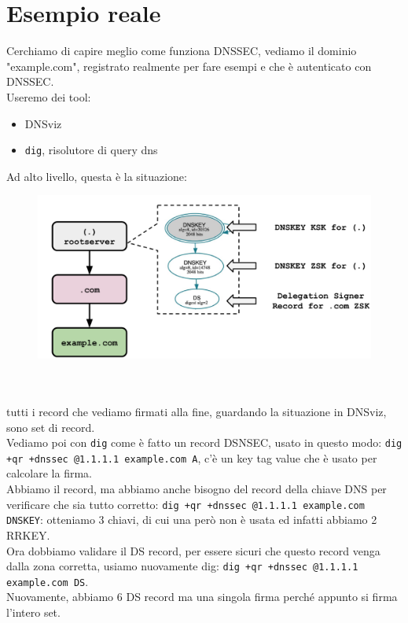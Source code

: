 \documentclass[12pt, oneside]{extbook} %
\begin{document}
\section{Esempio reale}
Cerchiamo di capire meglio come funziona DNSSEC, vediamo il dominio "example.com", registrato realmente per fare esempi e che è autenticato con DNSSEC.
\\Useremo dei tool:
\begin{itemize}
	\item DNSviz
	\item \texttt{dig}, risolutore di query dns
\end{itemize}
Ad alto livello, questa è la situazione:\\
\begin{figure}[h!]
    \centering
    \includegraphics[scale=0.5]{../../immagini/dns_ex_1}
\end{figure}\\\\
tutti i record che vediamo firmati alla fine, guardando la situazione in DNSviz, sono set di record.
\\Vediamo poi con \texttt{dig} come è fatto un record DSNSEC, usato in questo modo: \texttt{dig +qr +dnssec @1.1.1.1 example.com A}, c'è un key tag value che è usato per calcolare la firma.
\\Abbiamo il record, ma abbiamo anche bisogno del record della chiave DNS per verificare che sia tutto corretto: \texttt{dig +qr +dnssec @1.1.1.1 example.com DNSKEY}: otteniamo 3 chiavi, di cui una però non è usata ed infatti abbiamo 2 RRKEY.
\\Ora dobbiamo validare il DS record, per essere sicuri che questo record venga dalla zona corretta, usiamo nuovamente dig: \texttt{dig +qr +dnssec @1.1.1.1 example.com DS}.
\\Nuovamente, abbiamo 6 DS record ma una singola firma perché appunto si firma l'intero set.
\end{document}
